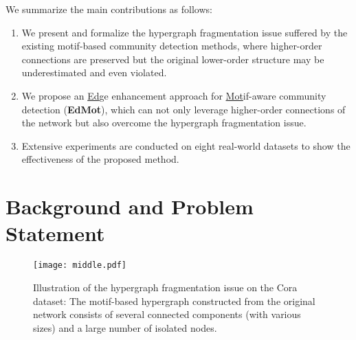 \documentclass[sigconf]{acmart}
\begin{document}
We summarize the main contributions as follows:
\begin{enumerate}[{1)}]
\item
We present and formalize the hypergraph fragmentation issue suffered by the existing motif-based community detection methods, where higher-order connections are preserved but the original lower-order structure may be underestimated and even violated.
\item
We propose an \underline{Ed}ge enhancement approach for \underline{Mot}if-aware community detection (\textbf{EdMot}), which can not only leverage higher-order connections of the network but also overcome the hypergraph fragmentation issue.
\item
Extensive experiments are conducted on eight real-world datasets to show the effectiveness of the proposed method.
\end{enumerate}



\section{Background and Problem Statement}
\label{sec:background}



\begin{figure*}[!t]
\vskip-0.1in
\begin{center}
\centerline{ {} \hskip -0.1in
{{\texttt{[image: middle.pdf]}\label{fig:middle}}}\hskip -0.05in
{}
}
\end{center}
\vskip-0.1in
\caption{Illustration of the hypergraph fragmentation issue on the Cora dataset: The motif-based hypergraph constructed from the original network consists of several connected components (with various sizes) and a large number of isolated nodes.}
\label{fig:coracompare}
\vskip-0.1in
\end{figure*}
\end{document}
